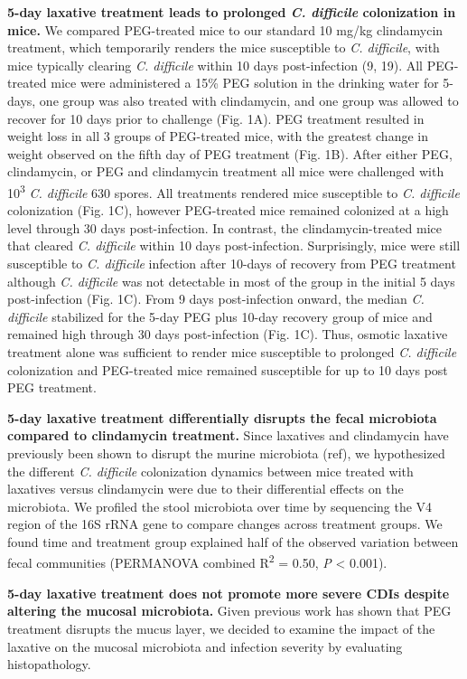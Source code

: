 \documentclass[
  11pt,
]{article}
\begin{document}
\textbf{5-day laxative treatment leads to prolonged \emph{C. difficile}
colonization in mice.} We compared PEG-treated mice to our standard 10
mg/kg clindamycin treatment, which temporarily renders the mice
susceptible to \emph{C. difficile}, with mice typically clearing
\emph{C. difficile} within 10 days post-infection (9, 19). All
PEG-treated mice were administered a 15\% PEG solution in the drinking
water for 5-days, one group was also treated with clindamycin, and one
group was allowed to recover for 10 days prior to challenge (Fig. 1A).
PEG treatment resulted in weight loss in all 3 groups of PEG-treated
mice, with the greatest change in weight observed on the fifth day of
PEG treatment (Fig. 1B). After either PEG, clindamycin, or PEG and
clindamycin treatment all mice were challenged with
10\textsuperscript{3} \emph{C. difficile} 630 spores. All treatments
rendered mice susceptible to \emph{C. difficile} colonization (Fig. 1C),
however PEG-treated mice remained colonized at a high level through 30
days post-infection. In contrast, the clindamycin-treated mice that
cleared \emph{C. difficile} within 10 days post-infection. Surprisingly,
mice were still susceptible to \emph{C. difficile} infection after
10-days of recovery from PEG treatment although \emph{C. difficile} was
not detectable in most of the group in the initial 5 days post-infection
(Fig. 1C). From 9 days post-infection onward, the median \emph{C.
difficile} stabilized for the 5-day PEG plus 10-day recovery group of
mice and remained high through 30 days post-infection (Fig. 1C). Thus,
osmotic laxative treatment alone was sufficient to render mice
susceptible to prolonged \emph{C. difficile} colonization and
PEG-treated mice remained susceptible for up to 10 days post PEG
treatment.

\textbf{5-day laxative treatment differentially disrupts the fecal
microbiota compared to clindamycin treatment.} Since laxatives and
clindamycin have previously been shown to disrupt the murine microbiota
(ref), we hypothesized the different \emph{C. difficile} colonization
dynamics between mice treated with laxatives versus clindamycin were due
to their differential effects on the microbiota. We profiled the stool
microbiota over time by sequencing the V4 region of the 16S rRNA gene to
compare changes across treatment groups. We found time and treatment
group explained half of the observed variation between fecal communities
(PERMANOVA combined R\textsuperscript{2} = 0.50, \emph{P} \textless{}
0.001).

\textbf{5-day laxative treatment does not promote more severe CDIs
despite altering the mucosal microbiota.} Given previous work has shown
that PEG treatment disrupts the mucus layer, we decided to examine the
impact of the laxative on the mucosal microbiota and infection severity
by evaluating histopathology.
\end{document}
